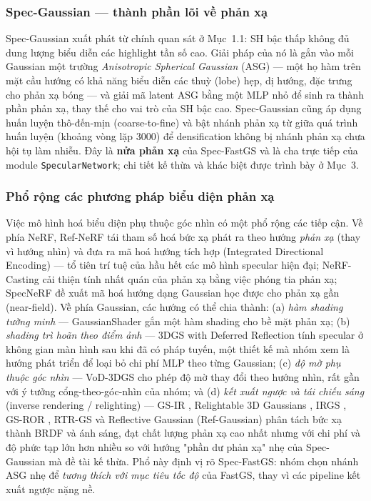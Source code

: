         \subsubsection{Spec-Gaussian — thành phần lõi về phản xạ}
        Spec-Gaussian \cite{specgaussian} xuất phát từ chính quan sát ở
        Mục~1.1: SH bậc thấp không đủ dung lượng biểu diễn các highlight tần số cao.
        Giải pháp của nó là gắn vào mỗi Gaussian một trường \textit{Anisotropic
        Spherical Gaussian} (ASG) — một họ hàm trên mặt cầu hướng có khả năng biểu
        diễn các thuỳ (lobe) hẹp, dị hướng, đặc trưng cho phản xạ bóng — và giải mã
        latent ASG bằng một MLP nhỏ để sinh ra thành phần phản xạ, thay thế cho vai
        trò của SH bậc cao. Spec-Gaussian cũng áp dụng huấn luyện thô-đến-mịn
        (coarse-to-fine) và bật nhánh phản xạ từ giữa quá trình huấn luyện (khoảng
        vòng lặp 3000) để densification không bị nhánh phản xạ chưa hội tụ làm
        nhiễu. Đây là \textbf{nửa phản xạ} của Spec-FastGS và là cha trực tiếp của
        module \texttt{SpecularNetwork}; chi tiết kế thừa và khác biệt được trình
        bày ở Mục~3.

        \subsubsection{Phổ rộng các phương pháp biểu diện phản xạ}
        Việc mô hình hoá biểu diện phụ thuộc góc nhìn có một phổ rộng các tiếp cận.
        Về phía NeRF, Ref-NeRF \cite{refnerf} tái tham số hoá bức xạ phát ra theo
        hướng \textit{phản xạ} (thay vì hướng nhìn) và đưa ra mã hoá hướng tích hợp
        (Integrated Directional Encoding) — tổ tiên trí tuệ của hầu hết các mô hình
        specular hiện đại; NeRF-Casting \cite{nerfcasting} cải thiện tính nhất quán
        của phản xạ bằng việc phóng tia phản xạ; SpecNeRF \cite{specnerf} đề xuất mã
        hoá hướng dạng Gaussian học được cho phản xạ gần (near-field). Về phía
        Gaussian, các hướng có thể chia thành: (a) \textit{hàm shading tường minh} —
        GaussianShader \cite{gaussianshader} gắn một hàm shading cho bề mặt phản xạ;
        (b) \textit{shading trì hoãn theo điểm ảnh} — 3DGS with Deferred Reflection
        \cite{deferredrefl} tính specular ở không gian màn hình sau khi đã có pháp
        tuyến, một thiết kế mà nhóm xem là hướng phát triển để loại bỏ chi phí MLP
        theo từng Gaussian; (c) \textit{độ mờ phụ thuộc góc nhìn} — VoD-3DGS
        \cite{vod3dgs} cho phép độ mờ thay đổi theo hướng nhìn, rất gần với ý tưởng
        cổng-theo-góc-nhìn của nhóm; và (d) \textit{kết xuất ngược và tái chiếu
        sáng} (inverse rendering / relighting) — GS-IR \cite{gs_ir}, Relightable
        3D Gaussians \cite{relightable3dgs}, IRGS \cite{irgs}, GS-ROR
        \cite{gsror}, RTR-GS \cite{rtrgs} và Reflective Gaussian (Ref-Gaussian)
        \cite{refgaussian} phân tách bức xạ thành BRDF và ánh sáng, đạt chất lượng
        phản xạ cao nhất nhưng với chi phí và độ phức tạp lớn hơn nhiều so với hướng
        "phần dư phản xạ" nhẹ của Spec-Gaussian mà đề tài kế thừa. Phổ này định vị
        rõ Spec-FastGS: nhóm chọn nhánh ASG nhẹ để \textit{tương thích với mục tiêu
        tốc độ} của FastGS, thay vì các pipeline kết xuất ngược nặng nề.

